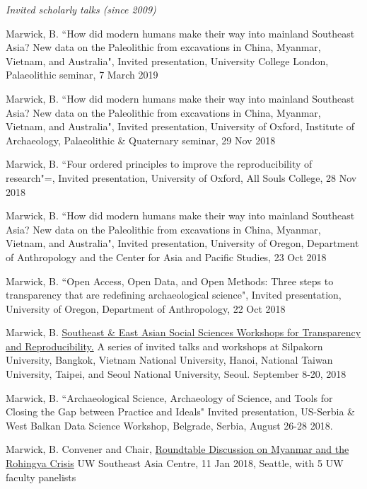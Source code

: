 

\medskip

\noindent\emph{Invited scholarly talks (since 2009)\vspace{0.01in}}

\medskip

\ind Marwick, B. ``How did modern humans make their way into mainland Southeast Asia? New data on the Paleolithic from excavations in China, Myanmar, Vietnam, and Australia", Invited presentation, University College London, Palaeolithic seminar, 7 March 2019

\ind Marwick, B. ``How did modern humans make their way into mainland Southeast Asia? New data on the Paleolithic from excavations in China, Myanmar, Vietnam, and Australia", Invited presentation, University of Oxford, Institute of Archaeology, Palaeolithic \& Quaternary seminar, 29 Nov 2018

\ind Marwick, B. ``Four ordered principles to improve the reproducibility of research"=, Invited presentation, University of Oxford, All Souls College, 28 Nov 2018

\ind Marwick, B. ``How did modern humans make their way into mainland Southeast Asia? New data on the Paleolithic from excavations in China, Myanmar, Vietnam, and Australia", Invited presentation, University of Oregon, Department of Anthropology and the Center for Asia and Pacific Studies, 23 Oct 2018

\ind Marwick, B. ``Open Access, Open Data, and Open Methods: Three steps to transparency that are redefining archaeological science", Invited presentation, University of Oregon, Department of Anthropology, 22 Oct 2018

\ind Marwick, B. \href{https://osf.io/ybj43/}{Southeast \& East Asian Social Sciences Workshops for Transparency and Reproducibility.} A series of invited talks and workshops at Silpakorn University, Bangkok, Vietnam National University, Hanoi, National Taiwan University, Taipei, and Seoul National University, Seoul. September 8-20, 2018

\ind Marwick, B. ``Archaeological Science, Archaeology of Science, and Tools for Closing the Gap between Practice and Ideals" Invited presentation, US-Serbia \& West Balkan Data Science Workshop, Belgrade, Serbia, August 26-28 2018.

\ind Marwick, B. Convener and Chair, \href{https://jsis.washington.edu/seac/news/roundtable-discussion-myanmar-rohingya-crisis-2/}{Roundtable Discussion on Myanmar and the Rohingya Crisis} UW Southeast Asia Centre, 11 Jan 2018, Seattle, with 5 UW faculty panelists

